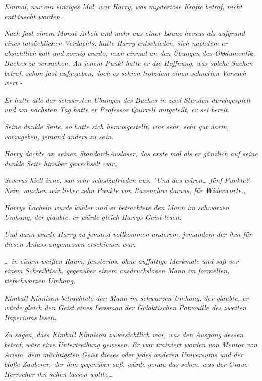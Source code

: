 {\emph{\emph{Einmal,}} \emph{nur} \emph{\emph{ein einziges Mal,}} \emph{war Harry,} \emph{was mysteriöse Kräfte} \emph{betraf, nicht enttäuscht worden.}

\emph{Nach fast einem Monat Arbeit und mehr aus einer Laune heraus als aufgrund eines tatsächlichen Verdachts, hatte Harry entschieden,} \emph{sich nachdem er} \emph{absichtlich kalt und zornig} \emph{wurde,} \emph{noch einmal an den Übungen des Okklumentik-Buches zu versuchen. An jenem Punkt hatte er die Hoffnung, was solche Sachen betraf, schon fast aufgegeben, doch es schien trotzdem einen schnellen Versuch wert -}

\emph{Er hatte alle der schwersten Übungen des Buches in zwei Stunden durchgespielt und am nächsten Tag hatte er Professor Quirrell mitgeteilt, er sei bereit.}

\emph{Seine dunkle Seite, so hatte sich herausgestellt, war sehr,} \emph{\emph{sehr}} \emph{gut darin, vorzugeben, jemand anders zu sein.}

\emph{Harry dachte an seinen Standard-Auslöser, das erste mal als er gänzlich auf seine dunkle Seite hinüber gewechselt war…}

\emph{\emph{Severus hielt inne, sah sehr selbstzufrieden aus. "Und das wären… fünf Punkte? Nein, machen wir lieber zehn Punkte von Ravenclaw daraus, für Widerworte.„}}

\emph{Harrys Lächeln wurde kühler und er betrachtete den Mann im schwarzen Umhang, der} \emph{glaubte, er würde gleich Harrys Geist lesen.}

\emph{Und dann wurde Harry zu jemand vollkommen anderem, jemandem der ihm für diesen Anlass angemessen erschienen war.}

\emph{… in einem weißen Raum, fensterlos, ohne auffällige Merkmale und saß vor einem Schreibtisch, gegenüber einem ausdruckslosen Mann im} \emph{formellen,} \emph{tiefschwarzen Umhang.}

\emph{Kimball Kinnison betrachtete den Mann im schwarzen Umhang, der} \emph{glaubte, er würde gleich den Geist eines Lensman der Galaktischen Patrouille} \emph{des zweiten Imperiums} \emph{lesen.}

\emph{Zu sagen, dass Kimball Kinnison zuversichtlich war, was den Ausgang dessen betraf, wäre eine Untertreibung gewesen. Er war trainiert worden von Mentor von Arisia, dem mächtigsten Geist dieses oder jedes anderen Universums und der bloße Zauberer, der ihm gegenüber saß, würde genau das sehen, was der Graue Herrscher ihn sehen lassen wollte…}

}
